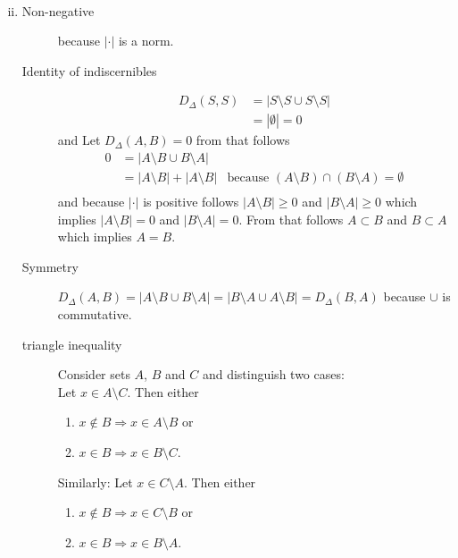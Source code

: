 \documentclass[10pt,a4paper,boxed]{hmcpset}
\begin{document}
\begin{solution}
\begin{enumerate}[(i)]
\begin{description}
\begin{align*}
							\end{align*}
					\end{description}
				\item 
					\begin{description}
						\item[Non-negative] because $|\cdot|$ is a norm.
						\item[Identity of indiscernibles] 
							\begin{align}
								D_\Delta(S,S) &= |S\setminus S \cup S\setminus S| \\
															&= | \emptyset	| = 0
							\end{align}
							and
							Let $D_\Delta(A,B) = 0$ from that follows 
							\begin{align}
								 0 &= |A\setminus B \cup B \setminus A| \\
								 &= | A \setminus B| + | A \setminus B| & \text{because } (A \setminus B) \cap (B \setminus A) = \emptyset \label{leererschnitt} \\
							\end{align}
							and because $| \cdot |$ is positive follows $|A \setminus B| \geq 0$ and $|B\setminus A| \geq 0$ which implies
							$|A \setminus B| = 0$ and $|B\setminus A| = 0$. From that follows $A \subset B$ and $B \subset A$ which implies $A=B$.
						\item[Symmetry] $D_\Delta(A,B) = |A \setminus B \cup B \setminus A| = | B \setminus A \cup A \setminus B| = D_\Delta(B,A)$ because $\cup$ is commutative.
						\item[triangle inequality]							
							Consider sets $A$, $B$ and $C$ and distinguish two cases:\\
							Let $x\in A \setminus C$. Then either
							\begin{enumerate}
								\item $x \notin B \Rightarrow x \in A \setminus B$ or
								\item $x \in B \Rightarrow x \in B \setminus C$.
							\end{enumerate}
							Similarly: Let $x\in C \setminus A$. Then either
							\begin{enumerate}
								\item $x \notin B \Rightarrow x \in C \setminus B$ or
								\item $x \in B \Rightarrow x \in B \setminus A$.
							\end{enumerate}
							\begin{align*}

\end{align*}
\end{description}
\end{enumerate}
\end{solution}
\end{document}
